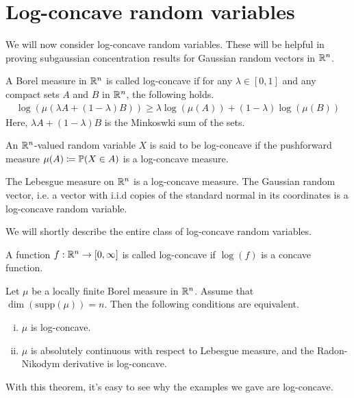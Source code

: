 \documentclass[11pt]{article}
\begin{document}
\section{Log-concave random variables}
\label{sec:log-concave-random}

We will now consider log-concave random variables. These will be helpful in proving subgaussian concentration results for Gaussian random vectors in $\R^n$.

\begin{definition}
  A Borel measure in $\R^n$ is called log-concave if for any $\lambda \in [0,1]$ and any compact sets $A$ and $B$ in $\R^n$, the following holds.
  \begin{align*}
    \log\left(  \mu\left( \lambda A + (1-\lambda)B \right) \right) \geq
    \lambda \log(\mu(A)) + (1-\lambda) \log(\mu(B))
  \end{align*}
  Here, $\lambda A + (1-\lambda)B$ is the Minkoswki sum of the sets.

  An $\R^n$-valued random variable $X$ is said to be log-concave if the pushforward measure $\mu(A) \coloneqq \P(X \in A)$ is a log-concave measure.
\end{definition}
\begin{example}
  The Lebesgue measure on $\R^n$ is a log-concave measure.
  The Gaussian random vector, i.e. a vector with i.i.d copies of the standard normal in its coordinates is a log-concave random variable.
\end{example}
We will shortly describe the entire class of log-concave random variables.
\begin{definition}
  A function $f: \R^n \to [0, \infty]$ is called log-concave if $\log(f)$ is a concave function.
\end{definition}

\begin{theorem}[Borell]
  Let $\mu$ be a locally finite Borel measure in $\R^n$. Assume that $\dim(\mathrm{supp}(\mu)) = n$.
  Then the following conditions are equivalent.
  \begin{enumerate}[(i)]
  \item $\mu$ is log-concave.
  \item $\mu$ is absolutely continuous with respect to Lebesgue measure, and the Radon-Nikodym derivative is log-concave.
  \end{enumerate}
\end{theorem}
With this theorem, it's easy to see why the examples we gave are log-concave.
\end{document}
